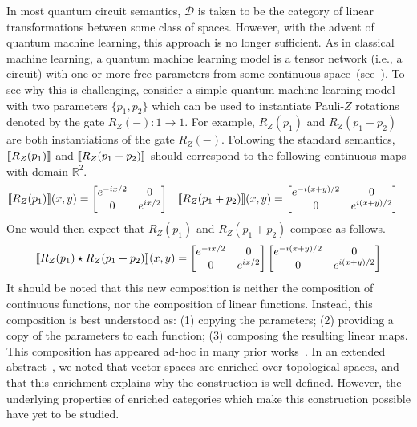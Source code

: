 In most quantum circuit semantics, $\mathcal{D}$ is taken to be the category of linear transformations between some class of spaces.
However, with the advent of quantum machine learning, this approach is no longer sufficient.
As in classical machine learning, a quantum machine learning model is a tensor network (i.e., a circuit) with one or more free parameters from some continuous space~(see~\cite{HugginsPatil2019}).
To see why this is challenging, consider a simple quantum machine learning model with two parameters $\{ p_1, p_2 \}$ which can be used to instantiate Pauli-$Z$ rotations denoted by the gate $R_Z( - ): 1 \to 1$.
For example, $R_Z( p_1 )$ and $R_Z( p_1 + p_2 )$ are both instantiations of the gate $R_Z( - )$.
Following the standard semantics, $\llbracket R_Z( p_1 )\rrbracket$ and $\llbracket R_Z( p_1 + p_2)\rrbracket$ should correspond to the following continuous maps with domain $\mathbb{R}^2$.
\begin{align*}
    \llbracket R_Z( p_1 )\rrbracket( x, y ) &=
    \begin{bmatrix}
        e^{-ix/2} & 0 \\
        0 & e^{ix/2}
    \end{bmatrix}
    &
    \llbracket R_Z( p_1 + p_2 )\rrbracket( x, y ) &=
    \begin{bmatrix}
        e^{-i(x+y)/2} & 0 \\
        0 & e^{i(x+y)/2}
    \end{bmatrix}
\end{align*}
One would then expect that $R_Z( p_1 )$ and $R_Z( p_1 + p_2 )$ compose as follows.
\begin{equation*}
    \llbracket R_Z( p_1 ) \star R_Z( p_1 + p_2 )\rrbracket( x, y )
    =
    \begin{bmatrix}
        e^{-ix/2} & 0 \\
        0 & e^{ix/2}
    \end{bmatrix}
    \begin{bmatrix}
        e^{-i(x+y)/2} & 0 \\
        0 & e^{i(x+y)/2}
    \end{bmatrix}
\end{equation*}
It should be noted that this new composition is neither the composition of continuous functions, nor the composition of linear functions.
Instead, this composition is best understood as: (1) copying the parameters; (2) providing a copy of the parameters to each function; (3) composing the resulting linear maps.
This composition has appeared ad-hoc in many prior works~\cite{JeandelPerdrix2018,MillerBakewell2020,XuLi2022,PehamBurgholzer2023,HongHuang2024}.
In an extended abstract~\cite{Wesley2025}, we noted that vector spaces are enriched over topological spaces, and that this enrichment explains why the construction is well-defined.
However, the underlying properties of enriched categories which make this construction possible have yet to be studied.

